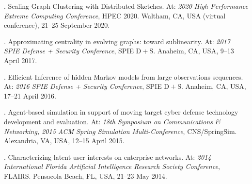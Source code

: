 \begin{innerlist}

\item[] \myname.
        Scaling Graph Clustering with Distributed Sketches.
        At: \emph{2020 High Performance Extreme Computing Conference},
        HPEC 2020.
	Waltham, CA, USA (virtual conference),
        21--25 September 2020.

\item[] \myname.
	Approximating centrality in evolving graphs: toward sublinearity.
	At: \emph{2017 SPIE Defense + Security Conference}, 
	SPIE D$\! + \!$S. 
	Anaheim, CA, USA,
        9--13 April 2017.

\item[] \myname.
	Efficient Inference of hidden Markov models from large observations sequences.
	At: \emph{2016 SPIE Defense + Security Conference}, 
	SPIE D$\! + \!$S. 
	Anaheim, CA, USA,
        17--21 April 2016.

\item[] \myname.
	Agent-based simulation in support of moving target cyber defense technology development and evaluation.
	At: \emph{18th Symposium on Communications \& Networking, 2015 ACM Spring Simulation Multi-Conference}, 
	CNS/SpringSim. 
	Alexandria, VA, USA,
        12--15 April 2015.

\item[] \myname.
	Characterizing latent user interests on enterprise networks.
	At: \emph{2014 International Florida Artificial Intelligence Research Society Conference},
	FLAIRS.
	Pensacola Beach, FL, USA,
	21--23 May 2014.

\end{innerlist}

